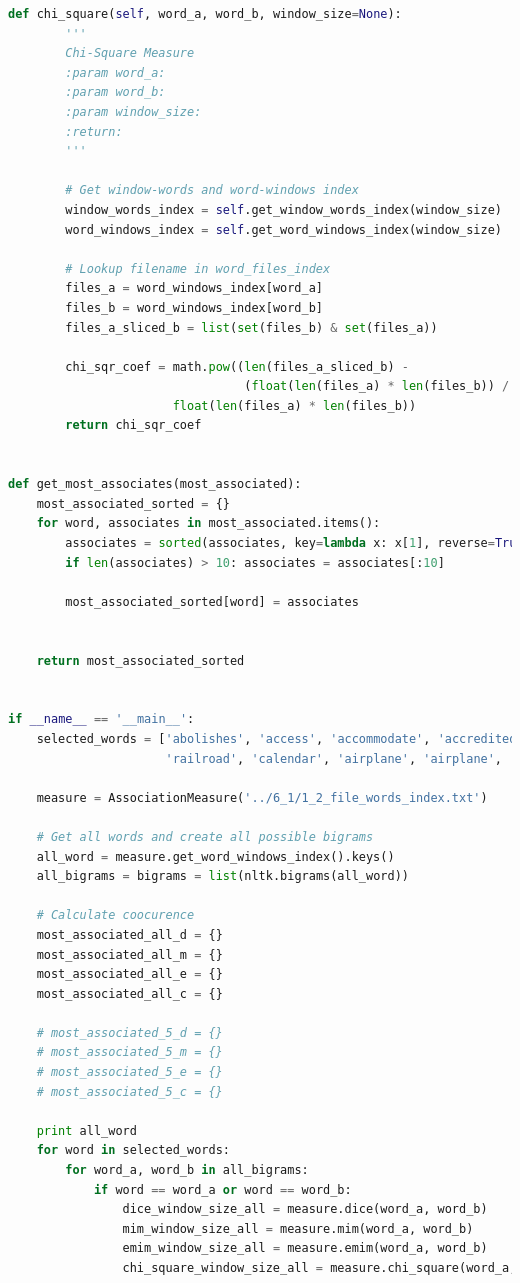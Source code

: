 \documentclass[letterpaper,11pt]{article}
\begin{document}
\begin{lstlisting}[language=python, caption={Association Measure}, label={lst:assoc_measure}]
    def chi_square(self, word_a, word_b, window_size=None):
        '''
        Chi-Square Measure
        :param word_a:
        :param word_b:
        :param window_size:
        :return:
        '''

        # Get window-words and word-windows index
        window_words_index = self.get_window_words_index(window_size)
        word_windows_index = self.get_word_windows_index(window_size)

        # Lookup filename in word_files_index
        files_a = word_windows_index[word_a]
        files_b = word_windows_index[word_b]
        files_a_sliced_b = list(set(files_b) & set(files_a))

        chi_sqr_coef = math.pow((len(files_a_sliced_b) -
                                 (float(len(files_a) * len(files_b)) / len(window_words_index))), 2) / \
                       float(len(files_a) * len(files_b))
        return chi_sqr_coef


def get_most_associates(most_associated):
    most_associated_sorted = {}
    for word, associates in most_associated.items():
        associates = sorted(associates, key=lambda x: x[1], reverse=True)
        if len(associates) > 10: associates = associates[:10]

        most_associated_sorted[word] = associates


    return most_associated_sorted


if __name__ == '__main__':
    selected_words = ['abolishes', 'access', 'accommodate', 'accredited', 'sky',
                      'railroad', 'calendar', 'airplane', 'airplane', 'bicycle']

    measure = AssociationMeasure('../6_1/1_2_file_words_index.txt')

    # Get all words and create all possible bigrams
    all_word = measure.get_word_windows_index().keys()
    all_bigrams = bigrams = list(nltk.bigrams(all_word))

    # Calculate coocurence
    most_associated_all_d = {}
    most_associated_all_m = {}
    most_associated_all_e = {}
    most_associated_all_c = {}

    # most_associated_5_d = {}
    # most_associated_5_m = {}
    # most_associated_5_e = {}
    # most_associated_5_c = {}

    print all_word
    for word in selected_words:
        for word_a, word_b in all_bigrams:
            if word == word_a or word == word_b:
                dice_window_size_all = measure.dice(word_a, word_b)
                mim_window_size_all = measure.mim(word_a, word_b)
                emim_window_size_all = measure.emim(word_a, word_b)
                chi_square_window_size_all = measure.chi_square(word_a, word_b)


\end{lstlisting}
\end{document}
